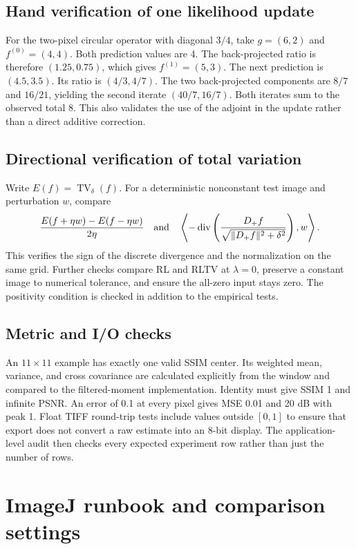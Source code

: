 \subsection{Hand verification of one likelihood update}

For the two-pixel circular operator with diagonal \(3/4\), take \(g=(6,2)\) and \(f^{(0)}=(4,4)\). Both prediction values are 4. The back-projected ratio is therefore \((1.25,0.75)\), which gives \(f^{(1)}=(5,3)\). The next prediction is \((4.5,3.5)\). Its ratio is \((4/3,4/7)\). The two back-projected components are \(8/7\) and \(16/21\), yielding the second iterate \((40/7,16/7)\). Both iterates sum to the observed total 8. This also validates the use of the adjoint in the update rather than a direct additive correction.

\subsection{Directional verification of total variation}

Write \(E(f)=\operatorname{TV}_\delta(f)\). For a deterministic nonconstant test image and perturbation \(w\), compare
\[
\frac{E(f+\eta w)-E(f-\eta w)}{2\eta}
\quad\text{and}\quad
\left\langle-\operatorname{div}
\left(\frac{D_+ f}{\sqrt{\lVert D_+ f\rVert^2+\delta^2}}\right),w\right\rangle .
\]
This verifies the sign of the discrete divergence and the normalization on the same grid. Further checks compare RL and RLTV at \(\lambda=0\), preserve a constant image to numerical tolerance, and ensure the all-zero input stays zero. The positivity condition is checked in addition to the empirical tests.

\subsection{Metric and I/O checks}

An \(11\times11\) example has exactly one valid SSIM center. Its weighted mean, variance, and cross covariance are calculated explicitly from the window and compared to the filtered-moment implementation. Identity must give SSIM 1 and infinite PSNR. An error of 0.1 at every pixel gives MSE 0.01 and 20 dB with peak 1. Float TIFF round-trip tests include values outside \([0,1]\) to ensure that export does not convert a raw estimate into an 8-bit display. The application-level audit then checks every expected experiment row rather than just the number of rows.

\clearpage
\section{ImageJ runbook and comparison settings}
\label{app:imagej}

